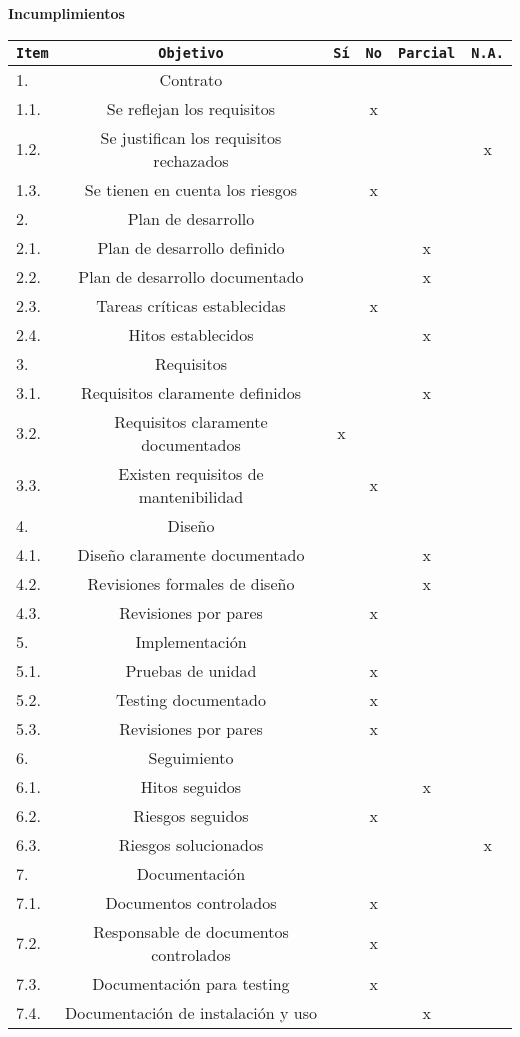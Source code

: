 \documentclass[a4paper,12pt]{report}
\begin{document}
\begin{center}
    {\Large \textbf{Incumplimientos}}


\vspace{0.5cm}


   \begin{tabular}{|l|c|c|c|c|c|}
\hline
\texttt{Item} & \texttt{Objetivo} & \texttt{S\'i} & \texttt{No} & \texttt{Parcial} &
\texttt{N.A.}\\
\hline
\rowcolor{Gray}
1. & Contrato &&&&\\
\hline
1.1. & Se reflejan los requisitos &&x&&\\
\hline
1.2. & Se justifican los requisitos rechazados &&&&x\\
\hline
1.3. & Se tienen en cuenta los riesgos &&x&&\\
\hline
\rowcolor{Gray}
2. & Plan de desarrollo &&&&\\
\hline
2.1. & Plan de desarrollo definido &&&x&\\
\hline
2.2. & Plan de desarrollo documentado &&&x&\\
\hline
2.3. & Tareas cr\'iticas establecidas &&x&&\\
\hline
2.4. & Hitos establecidos &&&x&\\
\hline
\rowcolor{Gray}
3. & Requisitos &&&&\\
\hline
3.1. & Requisitos claramente definidos &&&x&\\
\hline
3.2. & Requisitos claramente documentados &x&&&\\
\hline
3.3. & Existen requisitos de mantenibilidad &&x&&\\
\hline
\rowcolor{Gray}
4. & Dise\~no &&&&\\
\hline
4.1. & Dise\~no claramente documentado &&&x&\\
\hline
4.2. & Revisiones formales de dise\~no &&&x&\\
\hline
4.3. & Revisiones por pares &&x&&\\
\hline
\rowcolor{Gray}
5. & Implementaci\'on &&&&\\
\hline
5.1. & Pruebas de unidad &&x&&\\
\hline
5.2. & Testing documentado &&x&&\\
\hline
5.3. & Revisiones por pares &&x&&\\
\hline
\rowcolor{Gray}
6. & Seguimiento &&&&\\
\hline
6.1. & Hitos seguidos &&&x&\\
\hline
6.2. & Riesgos seguidos &&x&&\\
\hline
6.3. & Riesgos solucionados &&&&x\\
\hline
\rowcolor{Gray}
7. & Documentaci\'on &&&&\\
\hline
7.1. & Documentos controlados &&x&&\\
\hline
7.2. & Responsable de documentos controlados &&x&&\\
\hline
7.3. & Documentaci\'on para testing &&x&&\\
\hline
7.4. & Documentaci\'on de instalaci\'on y uso &&&x&\\
\hline
\end{tabular}
\end{center}
\vspace{2cm}
\end{document}
